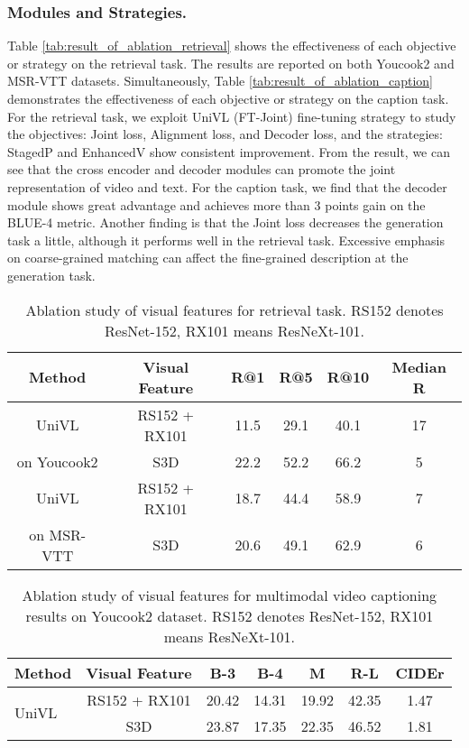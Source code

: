 \documentclass[11pt,a4paper]{article}
\begin{document}
	\subsubsection{Modules and Strategies.}
	Table \ref{tab:result_of_ablation_retrieval} shows the effectiveness of each objective or strategy on the retrieval task. The results are reported on both Youcook2 and MSR-VTT datasets. Simultaneously, Table \ref{tab:result_of_ablation_caption} demonstrates the effectiveness of each objective or strategy on the caption task. For the retrieval task, we exploit UniVL (FT-Joint) fine-tuning strategy to study the objectives: Joint loss, Alignment loss, and Decoder loss, and the strategies: StagedP and EnhancedV show consistent improvement. From the result, we can see that the cross encoder and decoder modules can promote the joint representation of video and text. For the caption task, we find that the decoder module shows great advantage and achieves more than 3 points gain on the BLUE-4 metric. Another finding is that the Joint loss decreases the generation task a little, although it performs well in the retrieval task. Excessive emphasis on coarse-grained matching can affect the fine-grained description at the generation task.
	\begin{table}[tp]  \small
		\centering
		\setlength{\tabcolsep}{1.5pt} \begin{tabular}{c|c|cccc}
			\toprule
			Method  & Visual Feature & R@1   & R@5 & R@10 & Median R  \\
			\midrule
			UniVL     & RS152 + RX101 & 11.5 & 29.1 & 40.1 & 17 \\
			on Youcook2    & S3D & 22.2 & 52.2 & 66.2 & 5 \\
			\midrule
			UniVL    & RS152 + RX101 & 18.7 & 44.4 & 58.9 & 7 \\
			on MSR-VTT    & S3D & 20.6 & 49.1 & 62.9 & 6 \\
			\bottomrule
		\end{tabular}
\caption{Ablation study of visual features for retrieval task. RS152 denotes ResNet-152, RX101 means ResNeXt-101.}
		\label{tab:retrieval_result_visual_feature}
	\end{table}
	\begin{table}[tbp] \small
		\setlength{\tabcolsep}{1.5pt}
		\centering
\begin{tabular}{l|c|ccccc}
			\toprule
			Method & Visual Feature & B-3 & B-4 & M & R-L & CIDEr \\ \midrule
			\multirow{2}{*}{UniVL} & RS152 + RX101  & 20.42  & 14.31 & 19.92 & 42.35 & 1.47 \\ 
			& S3D  & 23.87 & 17.35 & 22.35  & 46.52 & 1.81   \\  
			\bottomrule
		\end{tabular}
\caption{Ablation study of visual features for multimodal video captioning results on Youcook2 dataset. RS152 denotes ResNet-152, RX101 means ResNeXt-101.}
		\label{tab:caption_result_visual_feature}
	\end{table}
	
\end{document}
